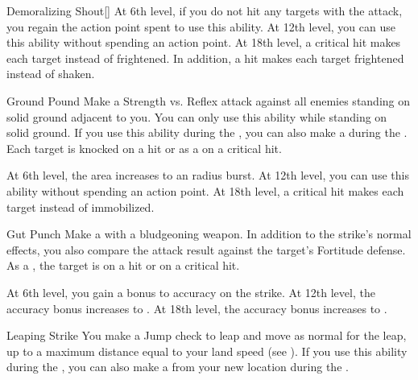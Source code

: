 {\begin{ability}{Demoralizing Shout}[]
                At 6th level, if you do not hit any targets with the attack, you regain the action point spent to use this ability.
                At 12th level, you can use this ability without spending an action point.
                At 18th level, a critical hit makes each target \panicked instead of frightened.
                In addition, a hit makes each target frightened instead of shaken.
            \end{ability}

            \begin{ability}{Ground Pound}
                Make a Strength vs. Reflex attack against all enemies standing on solid ground adjacent to you.
                You can only use this ability while standing on solid ground.
                If you use this ability during the , you can also make a  during the .
                Each target is knocked \prone on a hit or \immobilized as a  on a critical hit.

                At 6th level, the area increases to an \areamed radius burst.
                At 12th level, you can use this ability without spending an action point.
                At 18th level, a critical hit makes each target \stunned instead of immobilized.
            \end{ability}

            \begin{ability}{Gut Punch}
                Make a  with a bludgeoning weapon.
                In addition to the strike's normal effects, you also compare the attack result against the target's Fortitude defense.
                As a , the target is \sickened on a hit or \nauseated on a critical hit.

                At 6th level, you gain a  bonus to accuracy on the strike.
                At 12th level, the accuracy bonus increases to .
                At 18th level, the accuracy bonus increases to .
            \end{ability}

            \begin{ability}{Leaping Strike}
                You make a Jump check to leap and move as normal for the leap, up to a maximum distance equal to your land speed (see ).
                If you use this ability during the , you can also make a  from your new location during the .


\end{ability}}
